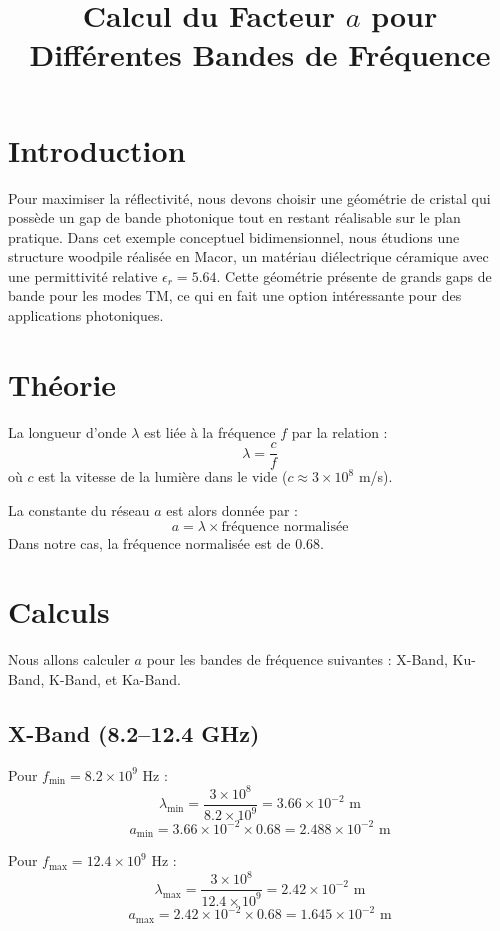 \documentclass{article}
\begin{document}
\title{Calcul du Facteur \( a \) pour Différentes Bandes de Fréquence}
\author{}
\date{}
\maketitle

\section{Introduction}
Pour maximiser la réflectivité, nous devons choisir une géométrie de cristal qui possède un gap de bande photonique tout en restant réalisable sur le plan pratique. Dans cet exemple conceptuel bidimensionnel, nous étudions une structure woodpile réalisée en Macor, un matériau diélectrique céramique avec une permittivité relative \( \epsilon_r = 5.64 \). Cette géométrie présente de grands gaps de bande pour les modes TM, ce qui en fait une option intéressante pour des applications photoniques.

\section{Théorie}
La longueur d'onde \( \lambda \) est liée à la fréquence \( f \) par la relation :
\[
\lambda = \frac{c}{f}
\]
où \( c \) est la vitesse de la lumière dans le vide (\( c \approx 3 \times 10^8 \) m/s).

La constante du réseau \( a \) est alors donnée par :
\[
a = \lambda \times \text{fréquence normalisée}
\]
Dans notre cas, la fréquence normalisée est de 0.68.

\section{Calculs}
Nous allons calculer \( a \) pour les bandes de fréquence suivantes : X-Band, Ku-Band, K-Band, et Ka-Band.

\subsection{X-Band (8.2–12.4 GHz)}
Pour \( f_{\text{min}} = 8.2 \times 10^9 \) Hz :
\[
\lambda_{\text{min}} = \frac{3 \times 10^8}{8.2 \times 10^9} = 3.66 \times 10^{-2} \text{ m}
\]
\[
a_{\text{min}} = 3.66 \times 10^{-2} \times 0.68 = 2.488 \times 10^{-2} \text{ m}
\]

Pour \( f_{\text{max}} = 12.4 \times 10^9 \) Hz :
\[
\lambda_{\text{max}} = \frac{3 \times 10^8}{12.4 \times 10^9} = 2.42 \times 10^{-2} \text{ m}
\]
\[
a_{\text{max}} = 2.42 \times 10^{-2} \times 0.68 = 1.645 \times 10^{-2} \text{ m}
\]
\end{document}

